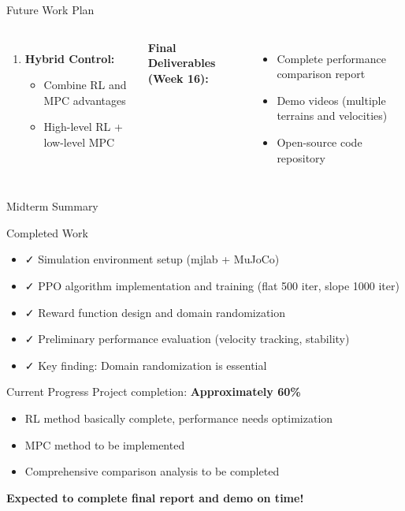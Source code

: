 \documentclass[aspectratio=169]{beamer}
\begin{document}
\begin{frame}{Future Work Plan}
\begin{columns}[T]
\begin{enumerate}
    \item \textbf{Hybrid Control:}
    \begin{itemize}
        \item Combine RL and MPC advantages
        \item High-level RL + low-level MPC
    \end{itemize}
\end{enumerate}

\vspace{0.3cm}
\textbf{Final Deliverables (Week 16):}
\begin{itemize}
    \item Complete performance comparison report
    \item Demo videos (multiple terrains and velocities)
    \item Open-source code repository
\end{itemize}
\end{columns}
\end{frame}

\begin{frame}{Midterm Summary}
\begin{block}{Completed Work}
\begin{itemize}
    \item ✓ Simulation environment setup (mjlab + MuJoCo)
    \item ✓ PPO algorithm implementation and training (flat 500 iter, slope 1000 iter)
    \item ✓ Reward function design and domain randomization
    \item ✓ Preliminary performance evaluation (velocity tracking, stability)
    \item ✓ Key finding: Domain randomization is essential
\end{itemize}
\end{block}

\begin{block}{Current Progress}
Project completion: \textbf{Approximately 60\%}
\begin{itemize}
    \item RL method basically complete, performance needs optimization
    \item MPC method to be implemented
    \item Comprehensive comparison analysis to be completed
\end{itemize}
\end{block}

\begin{center}
\textbf{Expected to complete final report and demo on time!}
\end{center}
\end{frame}
\end{document}
